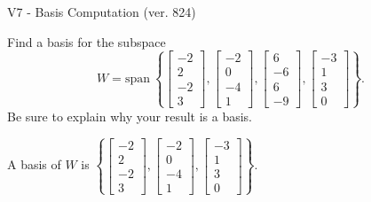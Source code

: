 \begin{exercise}
  \begin{exerciseTitle}V7 - Basis Computation (ver. 824)\end{exerciseTitle}
  \begin{exerciseStatement}
    Find a basis for the subspace 
\[W=\mathrm{span}\ \left\{\left[\begin{array}{r}
-2 \\
2 \\
-2 \\
3
\end{array}\right] , \left[\begin{array}{r}
-2 \\
0 \\
-4 \\
1
\end{array}\right] , \left[\begin{array}{r}
6 \\
-6 \\
6 \\
-9
\end{array}\right] , \left[\begin{array}{r}
-3 \\
1 \\
3 \\
0
\end{array}\right]\right\}.\]
 Be sure to explain why your result is a basis.


  \end{exerciseStatement}
  \begin{exerciseAnswer}
   A basis of \(W\) is  \(\left\{\left[\begin{array}{r}
-2 \\
2 \\
-2 \\
3
\end{array}\right] , \left[\begin{array}{r}
-2 \\
0 \\
-4 \\
1
\end{array}\right] , \left[\begin{array}{r}
-3 \\
1 \\
3 \\
0
\end{array}\right]\right\}\).
  


  \end{exerciseAnswer}
\end{exercise}